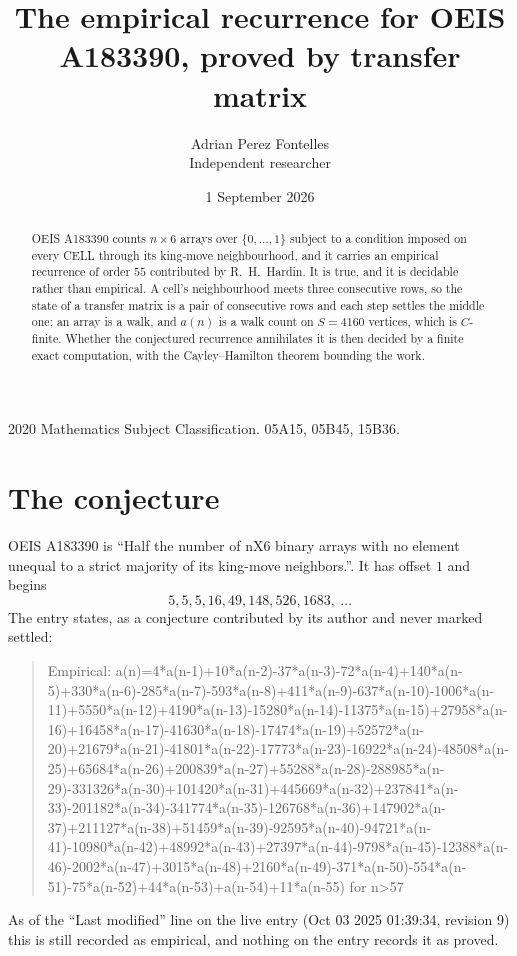 \documentclass[11pt,a4paper]{article}
\title{The empirical recurrence for OEIS A183390, proved by transfer matrix}
\author{Adrian Perez Fontelles\\ \small Independent researcher}
\date{1 September 2026}
\theoremstyle{plain}
\theoremstyle{definition}
\begin{document}
\maketitle

\begin{abstract}
OEIS A183390 counts $n\times6$ arrays over $\{0,\dots,1\}$ subject to a condition imposed on
every CELL through its king-move neighbourhood, and it carries an empirical recurrence of
order $55$ contributed by R.~H.~Hardin. It is true, and it is decidable rather than
empirical. A cell's neighbourhood meets three consecutive rows, so the state of a transfer
matrix is a pair of consecutive rows and each step settles the middle one; an array is a
walk, and $a(n)$ is a walk count on $S=4160$ vertices, which is $C$-finite. Whether the
conjectured recurrence annihilates it is then decided by a finite exact computation, with the
Cayley--Hamilton theorem bounding the work.
\end{abstract}

\noindent\small 2020 Mathematics Subject Classification. 05A15, 05B45, 15B36.\normalsize

\section{The conjecture}

OEIS A183390 is ``Half the number of nX6 binary arrays with no element unequal to a strict majority of its king-move neighbors.''. It has offset $1$ and begins
\[
5, 5, 5, 16, 49, 148, 526, 1683,\ \dots
\]
The entry states, as a conjecture contributed by its author and never marked settled:
\begin{quote}
Empirical: a(n)=4*a(n-1)+10*a(n-2)-37*a(n-3)-72*a(n-4)+140*a(n-5)+330*a(n-6)-285*a(n-7)-593*a(n-8)+411*a(n-9)-637*a(n-10)-1006*a(n-11)+5550*a(n-12)+4190*a(n-13)-15280*a(n-14)-11375*a(n-15)+27958*a(n-16)+16458*a(n-17)-41630*a(n-18)-17474*a(n-19)+52572*a(n-20)+21679*a(n-21)-41801*a(n-22)-17773*a(n-23)-16922*a(n-24)-48508*a(n-25)+65684*a(n-26)+200839*a(n-27)+55288*a(n-28)-288985*a(n-29)-331326*a(n-30)+101420*a(n-31)+445669*a(n-32)+237841*a(n-33)-201182*a(n-34)-341774*a(n-35)-126768*a(n-36)+147902*a(n-37)+211127*a(n-38)+51459*a(n-39)-92595*a(n-40)-94721*a(n-41)-10980*a(n-42)+48992*a(n-43)+27397*a(n-44)-9798*a(n-45)-12388*a(n-46)-2002*a(n-47)+3015*a(n-48)+2160*a(n-49)-371*a(n-50)-554*a(n-51)-75*a(n-52)+44*a(n-53)+a(n-54)+11*a(n-55) for n>57
\end{quote}
As of the ``Last modified'' line on the live entry (Oct 03 2025 01:39:34, revision 9) this is still
recorded as empirical, and nothing on the entry records it as proved.
\end{document}
